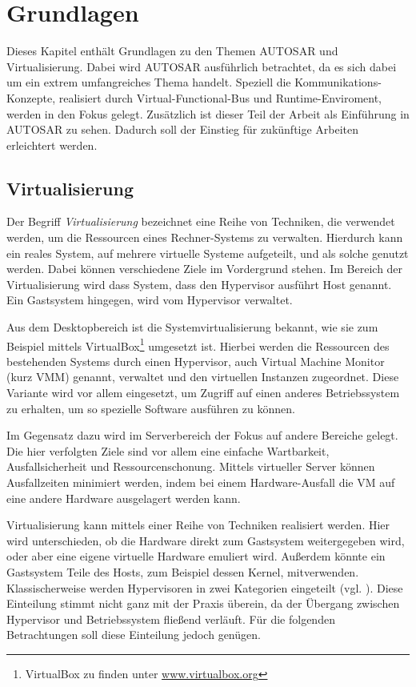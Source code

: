 \documentclass[
  a4paper,					    %
  twoside,
  DIV=calc,     				%
  bibliography=totoc,
  cleardoublepage=empty,
  ngerman,     					%
  final       					%
]{scrbook}
\begin{document}
\chapter{Grundlagen}
\label{sec:Grundlagen}
Dieses Kapitel enthält Grundlagen zu den Themen AUTOSAR und Virtualisierung. Dabei wird AUTOSAR ausführlich betrachtet, da es sich dabei um ein extrem umfangreiches Thema handelt. Speziell die Kommunikations-Konzepte, realisiert durch Virtual-Functional-Bus und Runtime-Enviroment, werden in den Fokus gelegt. Zusätzlich ist dieser Teil der Arbeit als Einführung in AUTOSAR zu sehen. Dadurch soll der Einstieg für zukünftige Arbeiten erleichtert werden.


\section{Virtualisierung}
\label{sec:Virtualisierung}
Der Begriff \emph{Virtualisierung} bezeichnet eine Reihe von Techniken, die verwendet werden, um die Ressourcen eines Rechner-Systems zu verwalten. Hierdurch kann ein reales System, auf mehrere virtuelle Systeme aufgeteilt, und als solche genutzt werden. Dabei können verschiedene Ziele im Vordergrund stehen. Im Bereich der Virtualisierung wird dass System, dass den Hypervisor ausführt Host genannt. Ein Gastsystem hingegen, wird vom Hypervisor verwaltet.

Aus dem Desktopbereich ist die Systemvirtualisierung bekannt, wie sie zum Beispiel mittels VirtualBox\footnote{VirtualBox zu finden unter \url{www.virtualbox.org}} umgesetzt ist. Hierbei werden die Ressourcen des bestehenden Systems durch einen Hypervisor, auch Virtual Machine Monitor (kurz VMM) genannt, verwaltet und den virtuellen Instanzen zugeordnet. Diese Variante wird vor allem eingesetzt, um Zugriff auf einen anderes Betriebssystem zu erhalten, um so spezielle Software ausführen zu können.

Im Gegensatz dazu wird im Serverbereich der Fokus auf andere Bereiche gelegt. Die hier verfolgten Ziele sind vor allem eine einfache Wartbarkeit, Ausfallsicherheit und Ressourcenschonung. Mittels virtueller Server können Ausfallzeiten minimiert werden, indem bei einem Hardware-Ausfall die VM auf eine andere Hardware ausgelagert werden kann.

Virtualisierung kann mittels einer Reihe von Techniken realisiert werden. Hier wird unterschieden, ob die Hardware direkt zum Gastsystem weitergegeben wird, oder aber eine eigene virtuelle Hardware emuliert wird. Außerdem könnte ein Gastsystem Teile des Hosts, zum Beispiel dessen Kernel, mitverwenden. Klassischerweise werden Hypervisoren in zwei Kategorien eingeteilt (vgl. \cite[Seite 22 ff.]{hypervisor}). Diese Einteilung stimmt nicht ganz mit der Praxis überein, da der Übergang zwischen Hypervisor und Betriebssystem fließend verläuft. Für die folgenden Betrachtungen soll diese Einteilung jedoch genügen.
\end{document}
